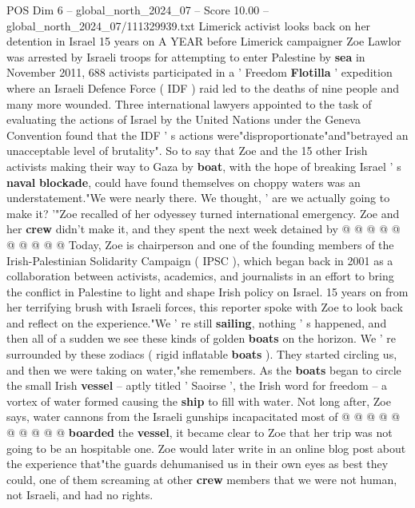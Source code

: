 \begin{textsample}{POS Dim 6 – global\_north\_2024\_07 – Score 10.00 – global\_north\_2024\_07/111329939.txt}  \label{ex:f6_pos_231}
Limerick activist looks back on her detention in Israel 15 years on A YEAR before Limerick campaigner Zoe Lawlor was arrested by Israeli troops for attempting to enter Palestine by \textbf{sea} in November 2011, 688 activists participated in a ' Freedom \textbf{Flotilla} ' expedition where an Israeli Defence Force ( IDF ) raid led to the deaths of nine people and many more wounded.
Three international lawyers appointed to the task of evaluating the actions of Israel by the United Nations under the Geneva Convention found that the IDF ' s actions were"disproportionate"and"betrayed an unacceptable level of brutality".
So to say that Zoe and the 15 other Irish activists making their way to Gaza by \textbf{boat}, with the hope of breaking Israel ' s \textbf{naval} \textbf{blockade}, could have found themselves on choppy waters was an understatement."We were nearly there.
We thought, ' are we actually going to make it? '"Zoe recalled of her odyessey turned international emergency.
Zoe and her \textbf{crew} didn't make it, and they spent the next week detained by @ @ @ @ @ @ @ @ @ @ Today, Zoe is chairperson and one of the founding members of the Irish-Palestinian Solidarity Campaign ( IPSC ), which began back in 2001 as a collaboration between activists, academics, and journalists in an effort to bring the conflict in Palestine to light and shape Irish policy on Israel. 15 years on from her terrifying brush with Israeli forces, this reporter spoke with Zoe to look back and reflect on the experience."We ' re still \textbf{sailing}, nothing ' s happened, and then all of a sudden we see these kinds of golden \textbf{boats} on the horizon.
We ' re surrounded by these zodiacs ( rigid inflatable \textbf{boats} ).
They started circling us, and then we were taking on water,"she remembers.
As the \textbf{boats} began to circle the small Irish \textbf{vessel} -- aptly titled ' Saoirse ', the Irish word for freedom -- a vortex of water formed causing the \textbf{ship} to fill with water.
Not long after, Zoe says, water cannons from the Israeli gunships incapacitated most of @ @ @ @ @ @ @ @ @ @ \textbf{boarded} the \textbf{vessel}, it became clear to Zoe that her trip was not going to be an hospitable one.
Zoe would later write in an online blog post about the experience that"the guards dehumanised us in their own eyes as best they could, one of them screaming at other \textbf{crew} members that we were not human, not Israeli, and had no rights.

\end{textsample}
